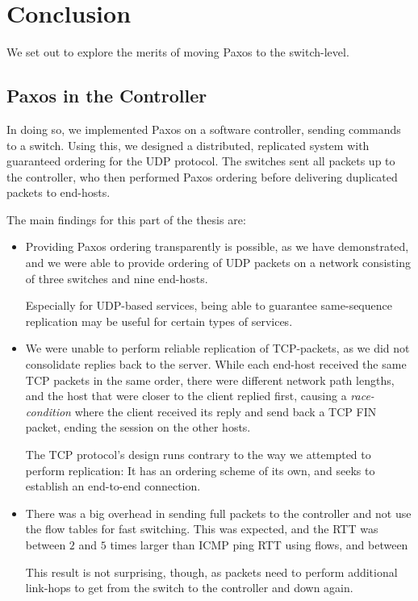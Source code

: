 \chapter{Conclusion}
\label{chapter:conclusion}

We set out to explore the merits of moving Paxos to the switch-level.

\section{Paxos in the Controller}

In doing so, we implemented Paxos on a software controller, sending commands
to a switch.  Using this, we designed a distributed, replicated system with
guaranteed ordering for the UDP protocol.  The switches sent all packets up
to the controller, who then performed Paxos ordering before delivering
duplicated packets to end-hosts.

The main findings for this part of the thesis are:

\begin{itemize}
  \item Providing Paxos ordering transparently is possible, as we have
  demonstrated, and we were able to provide ordering of \acs{UDP} packets on
  a network consisting of three switches and nine end-hosts.

  Especially for UDP-based services, being able to guarantee same-sequence
  replication may be useful for certain types of services.

  \item We were unable to perform reliable replication of \acs{TCP}-packets,
  as we did not consolidate replies back to the server.  While each end-host
  received the same \acs{TCP} packets in the same order, there were
  different network path lengths, and the host that were closer to the
  client replied first, causing a \textit{race-condition} where the client
  received its reply and send back a TCP FIN packet, ending the session on
  the other hosts.

  The TCP protocol's design runs contrary to the way we attempted to perform
  replication:  It has an ordering scheme of its own, and seeks to establish
  an end-to-end connection.

  \item There was a big overhead in sending full packets to the controller
  and not use the flow tables for fast switching.  This was expected, and
  the \acs{RTT} was between $2$ and $5$ times larger than ICMP ping RTT
  using flows, and between

  This result is not surprising, though, as packets need to perform
  additional link-hops to get from the switch to the controller and down
  again.

\end{itemize}

